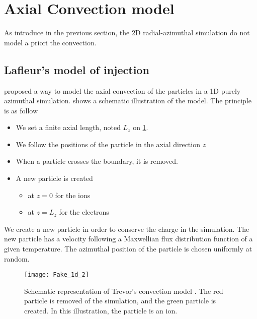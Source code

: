 
\section{Axial Convection model}
  \label{sec-reinjectionnoise}

  As introduce in the previous section, the \ac{2D} radial-azimuthal simulation do not model a priori the convection.

  \subsection{Lafleur's model of injection}

    \citet{lafleur2016a} proposed a way to model the axial convection of the particles in a \ac{1D} purely azimuthal simulation.
     shows a schematic illustration of the model.
    The principle is as follow
    \begin{itemize}
      \item We set a finite axial length, noted $L_z$ on \cref{fig-Fake_1d_1}.
      \item We follow the positions of the particle in the axial direction $z$
      \item When a particle crosses the boundary, it is removed.
      \item A new particle is created
      \begin{itemize}
        \item at $z=0$ for the ions
        \item  at $z=L_z$ for the electrons
      \end{itemize}
    \end{itemize}

    We create a new particle in order to conserve the charge in the simulation.
    The new particle has a velocity following a Maxwellian flux distribution function of a given temperature.
    The azimuthal position of the particle is chosen uniformly at random.


    \begin{figure}[hbtp]
      \centering
      \texttt{[image: Fake\_1d\_2]}
      \caption{Schematic representation of Trevor's convection model \citep{lafleur2016a}. The red particle is removed of the simulation, and the green particle is created. In this illustration, the particle is an ion. }
      \label{fig-Fake_1d_1}
    \end{figure}

